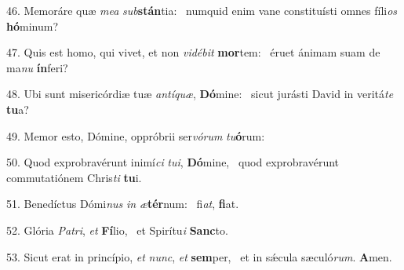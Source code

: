 46. Memoráre quæ \textit{me}\textit{a} \textit{sub}\textbf{stán}tia: \ast\  numquid enim vane constituísti omnes fíli\textit{os} \textbf{hó}minum?\

47. Quis est homo, qui vivet, et non \textit{vi}\textit{dé}\textit{bit} \textbf{mor}tem: \ast\  éruet ánimam suam de ma\textit{nu} \textbf{ín}feri?\

48. Ubi sunt misericórdiæ tuæ \textit{an}\textit{tí}\textit{quæ}, \textbf{Dó}mine: \ast\  sicut jurásti David in veritá\textit{te} \textbf{tu}a?\

49. Memor esto, Dómine, oppróbrii ser\textit{vó}\textit{rum} \textit{tu}\textbf{ó}rum: \ast\  \

50. Quod exprobravérunt inimí\textit{ci} \textit{tu}\textit{i}, \textbf{Dó}mine, \ast\  quod exprobravérunt commutatiónem Chris\textit{ti} \textbf{tu}i.\

51. Benedíctus Dómi\textit{nus} \textit{in} \textit{æ}\textbf{tér}num: \ast\  fi\textit{at}, \textbf{fi}at.\

52. Glória \textit{Pa}\textit{tri}, \textit{et} \textbf{Fí}lio, \ast\  et Spirítu\textit{i} \textbf{Sanc}to.\

53. Sicut erat in princípio, \textit{et} \textit{nunc}, \textit{et} \textbf{sem}per, \ast\  et in sǽcula sæculó\textit{rum}. \textbf{A}men.\

